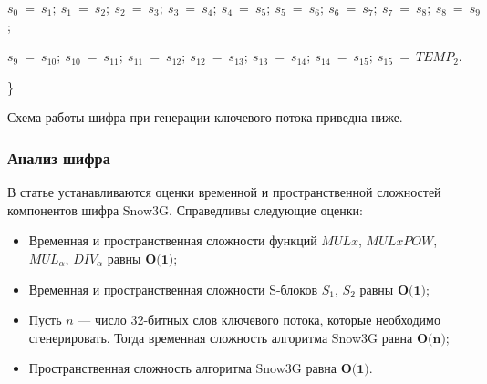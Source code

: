 \documentclass{./civarticle}
\begin{document}
\begin{itemize}
    \hspace{0.5cm}$s_0~=~s_1;~s_1~=~s_2;~s_2~=~s_3;~s_3~=~s_4;~s_4~=~s_5;~s_5~=~s_6;~s_6~=~s_7;~s_7~=~s_8;~s_8~=~s_9$;
    
    \hspace{0.5cm}$s_9~=~s_{10};~s_{10}~=~s_{11};~s_{11}~=~s_{12};~s_{12}~=~s_{13};~s_{13}~=~s_{14};~s_{14}~=~s_{15};~s_{15}~=~TEMP_2$.

\}

Схема работы шифра при генерации ключевого потока приведна ниже.
\begin{figure}[h!]
\end{figure}
    
\end{itemize}

\subsubsection{Анализ шифра}

В статье \cite{snow3g_2} устанавливаются оценки временной и пространственной сложностей компонентов шифра Snow3G. Справедливы следующие оценки:
\begin{itemize}
    \item Временная и пространственная сложности функций $MULx$, $MULxPOW$, $MUL_\alpha$, $DIV_\alpha$ равны $\textbf{O(1)}$;
    \item Временная и пространственная сложности S-блоков $S_1$, $S_2$ равны $\textbf{O(1)}$;
    \item Пусть $n$ --- число 32-битных слов ключевого потока, которые необходимо сгенерировать. Тогда временная сложность алгоритма Snow3G равна $\textbf{O(n)}$;
    \item Пространственная сложность алгоритма Snow3G равна $\textbf{O(1)}$.
\end{itemize}
\end{document}
